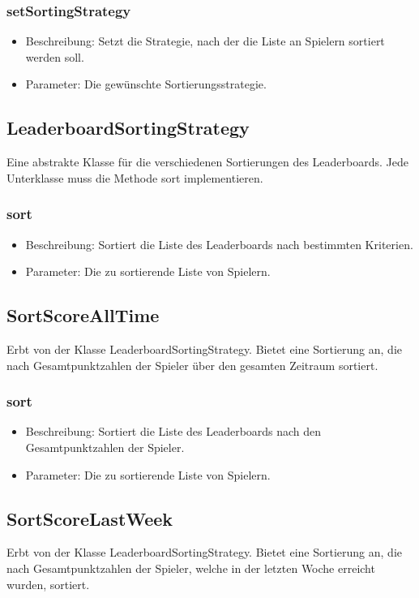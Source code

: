 \documentclass[a4paper]{scrreprt}
\begin{document}
    \subsubsection{setSortingStrategy}
    \begin{itemize}
        \item Beschreibung: Setzt die Strategie, nach der die Liste an Spielern sortiert werden soll.
        \item Parameter: Die gewünschte Sortierungsstrategie.
    \end{itemize}

    \subsection{LeaderboardSortingStrategy}
    Eine abstrakte Klasse für die verschiedenen Sortierungen des Leaderboards. Jede Unterklasse muss die Methode sort implementieren.
    \subsubsection{sort}
    \begin{itemize}
        \item Beschreibung: Sortiert die Liste des Leaderboards nach bestimmten Kriterien.
        \item Parameter: Die zu sortierende Liste von Spielern.
    \end{itemize}

    \subsection{SortScoreAllTime}
    Erbt von der Klasse LeaderboardSortingStrategy. Bietet eine Sortierung an, die nach Gesamtpunktzahlen der Spieler über den gesamten Zeitraum sortiert.
    \subsubsection{sort}
    \begin{itemize}
        \item Beschreibung: Sortiert die Liste des Leaderboards nach den Gesamtpunktzahlen der Spieler.
        \item Parameter: Die zu sortierende Liste von Spielern.
    \end{itemize}

    \subsection{SortScoreLastWeek}
    Erbt von der Klasse LeaderboardSortingStrategy. Bietet eine Sortierung an, die nach Gesamtpunktzahlen der Spieler, welche in der letzten Woche erreicht wurden, sortiert.
\end{document}

